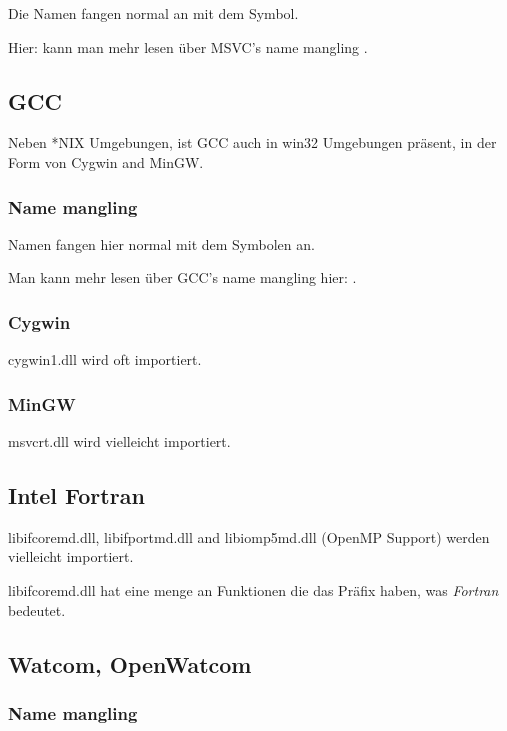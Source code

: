 Die Namen fangen normal an mit dem  Symbol.

Hier:  kann man mehr lesen \"uber MSVC's \gls{name mangling} . 

\subsection{GCC}

Neben *NIX Umgebungen, ist GCC auch in win32 Umgebungen pr\"asent, in der Form von Cygwin and MinGW. 

\subsubsection{Name mangling} 

Namen fangen hier normal mit dem  Symbolen an.

Man kann mehr lesen \"uber GCC's \gls{name mangling} hier: .

\subsubsection{Cygwin}

cygwin1.dll wird oft importiert.

\subsubsection{MinGW}

msvcrt.dll wird vielleicht importiert.

\subsection{Intel Fortran}


libifcoremd.dll, libifportmd.dll and libiomp5md.dll (OpenMP Support) werden vielleicht importiert.

libifcoremd.dll hat eine menge an Funktionen die das  Pr\"afix haben, was \emph{Fortran} bedeutet.

\subsection{Watcom, OpenWatcom}

\subsubsection{Name mangling}

